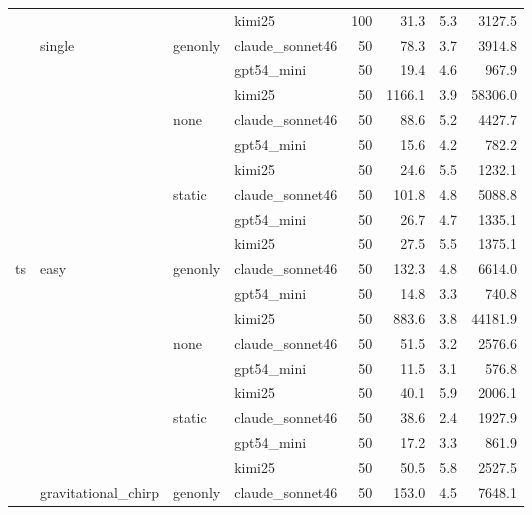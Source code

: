 \documentclass{article}
\begin{document}
\begin{table}[ht]
{\begin{tabular}{llllrrrr}
 &  &                           & kimi25           & 100 & 31.3   & 5.3 & 3127.5   \\
\cmidrule{2-8}
 & \multirow{9}{*}{single}
   & \multirow{3}{*}{genonly}  & claude\_sonnet46 & 50 & 78.3   & 3.7 & 3914.8   \\
 &  &                           & gpt54\_mini      & 50 & 19.4   & 4.6 & 967.9    \\
 &  &                           & kimi25           & 50 & 1166.1 & 3.9 & 58306.0  \\
 &  & \multirow{3}{*}{none}     & claude\_sonnet46 & 50 & 88.6   & 5.2 & 4427.7   \\
 &  &                           & gpt54\_mini      & 50 & 15.6   & 4.2 & 782.2    \\
 &  &                           & kimi25           & 50 & 24.6   & 5.5 & 1232.1   \\
 &  & \multirow{3}{*}{static}   & claude\_sonnet46 & 50 & 101.8  & 4.8 & 5088.8   \\
 &  &                           & gpt54\_mini      & 50 & 26.7   & 4.7 & 1335.1   \\
 &  &                           & kimi25           & 50 & 27.5   & 5.5 & 1375.1   \\
\midrule
\multirow{27}{*}{ts}
 & \multirow{9}{*}{easy}
   & \multirow{3}{*}{genonly}  & claude\_sonnet46 & 50 & 132.3  & 4.8 & 6614.0   \\
 &  &                           & gpt54\_mini      & 50 & 14.8   & 3.3 & 740.8    \\
 &  &                           & kimi25           & 50 & 883.6  & 3.8 & 44181.9  \\
 &  & \multirow{3}{*}{none}     & claude\_sonnet46 & 50 & 51.5   & 3.2 & 2576.6   \\
 &  &                           & gpt54\_mini      & 50 & 11.5   & 3.1 & 576.8    \\
 &  &                           & kimi25           & 50 & 40.1   & 5.9 & 2006.1   \\
 &  & \multirow{3}{*}{static}   & claude\_sonnet46 & 50 & 38.6   & 2.4 & 1927.9   \\
 &  &                           & gpt54\_mini      & 50 & 17.2   & 3.3 & 861.9    \\
 &  &                           & kimi25           & 50 & 50.5   & 5.8 & 2527.5   \\
\cmidrule{2-8}
 & \multirow{9}{*}{gravitational\_chirp}
   & \multirow{3}{*}{genonly}  & claude\_sonnet46 & 50 & 153.0  & 4.5 & 7648.1   \\

\end{tabular}}
\end{table}
\end{document}
